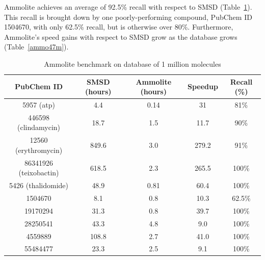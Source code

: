 \documentclass[review,preprint,12pt]{elsarticle}
\theoremstyle{definition}
\theoremstyle{remark}
\numberwithin{equation}{section}
\begin{document}
Ammolite achieves an average of 92.5\% recall with respect to SMSD (Table~\ref{ammo1m}). This recall is brought down by one poorly-performing compound, PubChem ID 1504670, with only 62.5\% recall, but is otherwise over 80\%.
Furthermore, Ammolite's speed gains with respect to SMSD grow as the database grows (Table~\ref{ammo47m}).
\begin{table}
    \caption{Benchmarks of Ammolite vs. SMSD on databases of (a) 1 million molecules and (b) 47 million molecules (all of PubChem)}


\begin{subtable}{1\textwidth}
\caption{Ammolite benchmark on database of 1 million molecules}
\label{ammo1m}
\begin{tabular}{ccccc}
\hline
PubChem ID & SMSD (hours) & Ammolite (hours) & Speedup & Recall (\%) \\
\hline
5957 (atp) & 4.4 & 0.14 & 31 & 81\% \\
\hline
446598 (clindamycin) & 18.7 & 1.5 & 11.7 & 90\% \\
\hline
12560 (erythromycin) & 849.6 & 3.0 & 279.2 & 91\% \\
\hline
86341926 (teixobactin) & 618.5 & 2.3 & 265.5 & 100\% \\
\hline
5426 (thalidomide) & 48.9 & 0.81 & 60.4 & 100\% \\
\hline
1504670 & 8.1 & 0.8 & 10.3 & 62.5\% \\
\hline
19170294 & 31.3 & 0.8 & 39.7 & 100\% \\
\hline
28250541 & 43.3 & 4.8 & 9.0 & 100\% \\
\hline
4559889 & 108.8 & 2.7 & 41.0 & 100\% \\
\hline
55484477 & 23.3 & 2.5 & 9.1 & 100\% \\
\hline

\end{tabular}
\end{subtable}

\vspace{1em}



\end{table}
\end{document}
